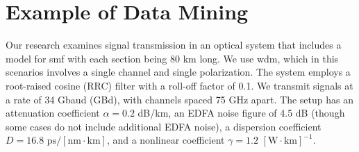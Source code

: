 



\section{Example of Data Mining}


Our research examines signal transmission in an optical system that includes a model for \gls{smf} with each section being 80 km long. We use \acrshort{wdm}, which in this scenarios involves a single channel and single polarization. The system employs a root-raised cosine (RRC) filter with a roll-off factor of 0.1. We transmit signals at a rate of 34 Gbaud (GBd), with channels spaced 75 GHz apart. The setup has an attenuation coefficient \( \alpha = 0.2 \) dB/km, an EDFA noise figure of 4.5 dB (though some cases do not include additional EDFA noise), a dispersion coefficient \( D = 16.8 \) $\textrm{ps}/[\textrm{nm} \cdot \textrm{km}]$, and a nonlinear coefficient $\gamma = 1.2$ $[\textrm{W} \cdot \textrm{km}]^{-1}$. 


